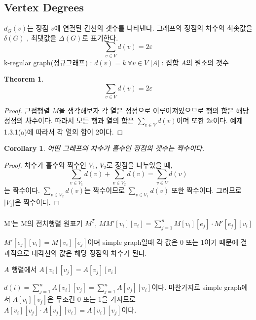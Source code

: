 \documentclass{oblivoir}
\newtheorem{theorem}{Theorem}[section]
\newtheorem{corollary}{Corollary}[theorem]
\begin{document}
\subsection{Vertex Degrees}
\begin{dfn}[degree(차수)] $d_G(v)$는 정점 $v$에 연결된 간선의 갯수를 나타낸다. 그래프의 정점의 차수의 최솟값을 $\delta(G)$ , 최댓값을 $\Delta(G)$로 표기한다.
    \[
        \sum_{v \in V} d(v) = 2 \varepsilon  
    \]
    k-regular graph(정규그래프) : $d(v) = k \:\forall v \in V$
    $|A|$ : 집합 $A$의 원소의 갯수
\end{dfn}

\begin{theorem}
    \[
        \sum_{v \in V} d(v) = 2\varepsilon  
    \]
\end{theorem}

\begin{proof}
    근접행렬 $M$을 생각해보자 각 열은 정점으로 이루어져있으므로 행의 합은 해당 정점의 차수이다. 따라서 모든 행과 열의 합은 $\sum_{v \in V} d(v)$이며 또한 $2\varepsilon $이다. 예제 1.3.1(a)에 따라서 각 열의 합이 2이다. 
\end{proof}

\begin{corollary}
    어떤 그래프의 차수가 홀수인 정점의 갯수는 짝수이다.
\end{corollary}

\begin{proof}
    차수가 홀수와 짝수인 $V_1$, $V_2$로 정점을 나누었을 때,
    \[
        \sum_{v \in V_1} d(v) + \sum_{v \in V_2} d(v) = \sum_{v \in V} d(v)
    \]
    는 짝수이다. $\sum_{v \in V_2} d(v)$는 짝수이므로 $\sum_{v \in V_1} d(v)$ 또한 짝수이다. 그러므로 $|V_1|$은 짝수이다.
\end{proof}

\subsubsection{}
\subsubsection{} 
M'는 M의 전치행렬 원표기 $M^{T}$,
$MM'[v_i][v_i] = \sum_{j=1}^n M[v_i][e_j] \cdot M'[e_j][v_i]$

$ M'[e_j][v_i] = M[v_i][e_j] $이며 simple graph일때 각 값은 0 또는 1이기 때문에 결과적으로 대각선의 값은 해당 정점의 차수가 된다.

$A$ 행렬에서 $A[v_i][v_j] = A[v_j][v_i]$ 

$d(i) = \sum_{j=1}^n A[v_i][v_j] = \sum_{j=1}^n A[v_j][v_i]$이다.
마찬가지로 simple graph에서 $A[v_i][v_j]$은 무조건 0 또는 1을 가지므로 $A[v_i][v_j] \cdot A[v_j][v_i] = A[v_i][v_j]$이다.
\end{document}

